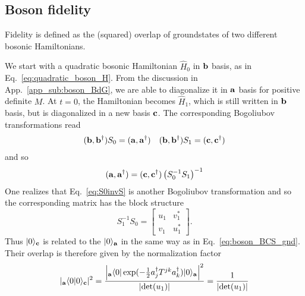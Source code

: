 \subsection{Boson fidelity} 
\label{app_sub:boson_fidelity}

Fidelity is defined as the (squared) overlap of groundstates of two different bosonic Hamiltonians. 

We start with a quadratic bosonic Hamiltonian $\hat{H}_0$ in ${\bf b}$ basis, as in Eq.~\eqref{eq:quadratic_boson_H}. From the discussion in App.~\ref{app_sub:boson_BdG}, we are able to diagonalize it in ${\bf a}$ basis for positive definite $M$. At $t=0$, the Hamiltonian becomes $\hat{H}_1$, which is still written in ${\bf b}$ basis, but is diagonalized in a new basis ${\bf c}$. The corresponding Bogoliubov transformations read
\begin{equation}\begin{aligned}
\label{eq:two_BdG}
({\bf b} , {\bf b}^\dagger)S_0=({\bf a} , {\bf a}^\dagger)\quad
({\bf b} , {\bf b}^\dagger)S_1=({\bf c} , {\bf c}^\dagger)
\end{aligned}\end{equation}
and so
\begin{equation}\begin{aligned}
\label{eq:S0invS}
({\bf a} , {\bf a}^\dagger)=({\bf c} , {\bf c}^\dagger)\left(S_0^{-1}S_1\right)^{-1}
\end{aligned}\end{equation}
One realizes that Eq.~\eqref{eq:S0invS} is another Bogoliubov transformation and so the corresponding matrix has the block structure
\begin{equation}
S_1^{-1}S_0=\begin{bmatrix}
u_1 & v_1^*\\
v_1 & u_1^*
\end{bmatrix}.
\end{equation}
Thus $|0\rangle_{\bf c}$ is related to the $|0\rangle_{{\bf a}}$ in the same way as in Eq.~\eqref{eq:boson_BCS_gnd}. Their overlap is therefore given by the normalization factor
\begin{equation}\begin{aligned}
|{}_{\bf a}\langle0|0\rangle_{\bf c}|^2=\frac{\Big|{}_{\bf a}\langle 0 | \exp( -\frac{1}{2} a_j^{\dagger} T^{jk} a_k^{\dagger} )|0   \rangle_{\bf a} \Big|^2}{|\text{det}(u_1)|} = \frac{1}{|\text{det}(u_1)|}
\end{aligned}\end{equation}

